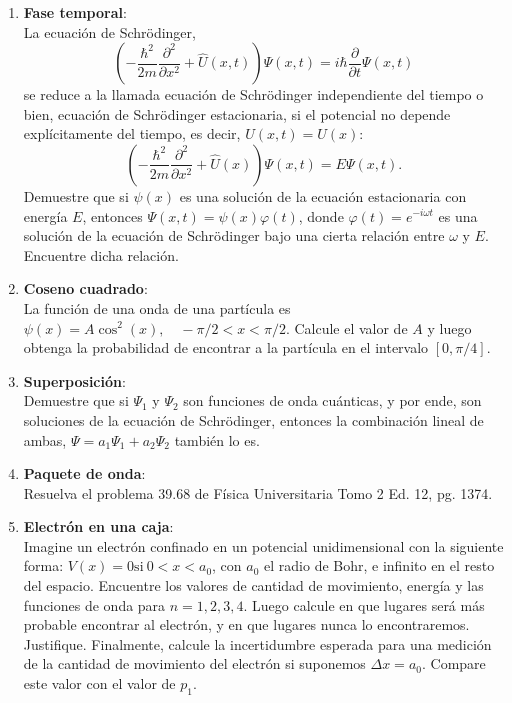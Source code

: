 \documentclass[a4paper,12pt]{article}
\begin{document}
\begin{enumerate}
\item {\bf{Fase temporal}}:\\
	La ecuación de Schrödinger, 
	$$\left (-\frac{\hbar^2}{2m}\frac{\partial^2}{\partial x^2} + \hat
	U(x,t)\right ) \Psi(x,t) = i \hbar \frac{\partial}{\partial t} \Psi(x,t)$$
	se reduce a la llamada ecuación de Schrödinger independiente del tiempo o
	bien, ecuación de Schrödinger estacionaria, si el potencial no depende
	explícitamente del tiempo, es decir, $U(x,t)=U(x)$: 
	$$\left (-\frac{\hbar^2}{2m}\frac{\partial^2}{\partial x^2} + \hat
	U(x)\right ) \Psi(x,t) = E \Psi(x,t).$$
	Demuestre que si $\psi(x)$ es una solución de la ecuación estacionaria con
	energía $E$, entonces $\Psi(x,t)=\psi(x)\varphi(t)$, donde
	$\varphi(t)=e^{-i \omega t}$ es una solución de la ecuación de Schrödinger
	bajo una cierta relación entre $\omega$ y $E$. Encuentre dicha relación. 

\item{\bf{Coseno cuadrado}}:\\
	La función de una onda de una partícula es $\psi(x)=A \cos^2(x), \quad
	-\pi/2 < x < \pi/2$. Calcule el valor de $A$ y luego obtenga la
	probabilidad de encontrar a la partícula en el intervalo $[0,\pi/4]$.

\item{\bf{Superposición}}:\\
	Demuestre que si $\Psi_1$ y $\Psi_2$ son funciones de onda cuánticas, y por
		ende, son soluciones de la ecuación de Schrödinger, entonces la
		combinación lineal de ambas, $\Psi=a_1 \Psi_1 + a_2 \Psi_2$ también lo
		es. 

\item {\bf{Paquete de onda}}:\\
	Resuelva el problema 39.68 de Física Universitaria Tomo 2 Ed. 12, pg. 1374.

\item {\bf{Electrón en una caja}}:\\
	Imagine un electrón confinado en un potencial unidimensional con la
	siguiente forma: $V(x)=0 \mathrm{si\ }0 < x < a_0$, con $a_0$ el radio de
	Bohr, e infinito en el resto del espacio. Encuentre los valores de cantidad
	de movimiento, energía y las funciones de onda para $n=1,2,3,4$. Luego
	calcule en que lugares será más probable encontrar al electrón, y en que
	lugares nunca lo encontraremos. Justifique. Finalmente, calcule la
	incertidumbre esperada para una medición de la cantidad de movimiento del
	electrón si suponemos $\Delta x=a_0$. Compare este valor con el valor de
	$p_1$.


\end{enumerate}
\end{document}
